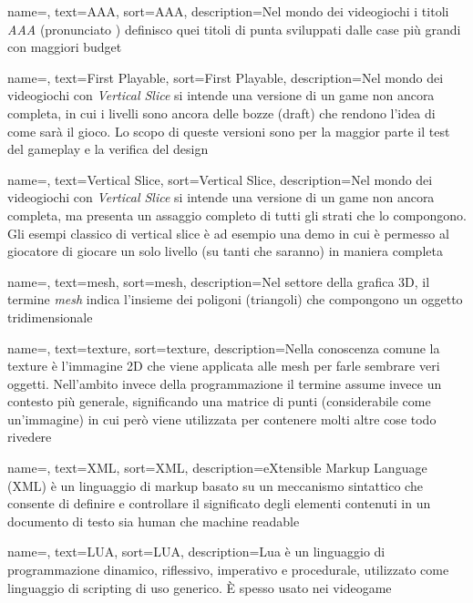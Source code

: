 {
	name=,
	text=AAA,
	sort=AAA,
	description={Nel mondo dei videogiochi i titoli \emph{AAA} (pronunciato ) definisco quei titoli di punta sviluppati dalle case più grandi con maggiori budget}
}

{
	name=,
	text=First Playable,
	sort=First Playable,
	description={Nel mondo dei videogiochi con \emph{Vertical Slice} si intende una versione di un game non ancora completa, in cui i livelli sono ancora delle bozze (draft) che rendono l'idea di come sarà il gioco. Lo scopo di queste versioni sono per la maggior parte il test del gameplay e la verifica del design}
}

{
	name=,
	text=Vertical Slice,
	sort=Vertical Slice,
	description={Nel mondo dei videogiochi con \emph{Vertical Slice} si intende una versione di un game non ancora completa, ma presenta un assaggio completo di tutti gli strati che lo compongono. Gli esempi classico di vertical slice è ad esempio una demo in cui è permesso al giocatore di giocare un solo livello (su tanti che saranno) in maniera completa}
}

{
	name=,
	text=mesh,
	sort=mesh,
	description={Nel settore della grafica 3D, il termine \emph{mesh} indica l'insieme dei poligoni (triangoli) che compongono un oggetto tridimensionale}
}

{
	name=,
	text=texture,
	sort=texture,
	description={Nella conoscenza comune la texture è l'immagine 2D che viene applicata alle mesh per farle sembrare veri oggetti. Nell'ambito invece della programmazione il termine assume invece un contesto più generale, significando una matrice di punti (considerabile come un'immagine) in cui però viene utilizzata per contenere molti altre cose todo rivedere}
}

{
	name=,
	text=XML,
	sort=XML,
	description={eXtensible Markup Language (XML) è un linguaggio di markup basato su un meccanismo sintattico che consente di definire e controllare il significato degli elementi contenuti in un documento di testo sia human che machine readable}
}

{
	name=,
	text=LUA,
	sort=LUA,
	description={Lua è un linguaggio di programmazione dinamico, riflessivo, imperativo e procedurale, utilizzato come linguaggio di scripting di uso generico. È spesso usato nei videogame}
}

